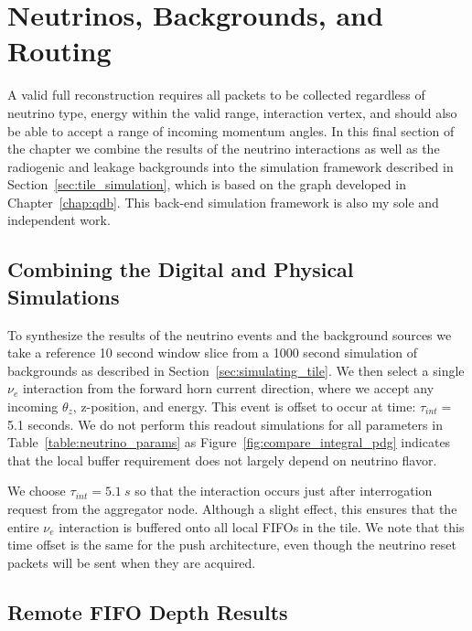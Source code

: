 \section{Neutrinos, Backgrounds, and Routing}

A valid full reconstruction requires all packets to be collected regardless of neutrino type, energy within the valid range, interaction vertex, and should also be able to accept a range of incoming momentum angles.
In this final section of the chapter we combine the results of the neutrino interactions as well as the radiogenic and leakage backgrounds into the simulation framework described in Section~\ref{sec:tile_simulation}, which is based on the graph developed in Chapter~\ref{chap:qdb}.
This back-end simulation framework is also my sole and independent work.

\subsection{Combining the Digital and Physical Simulations}

To synthesize the results of the neutrino events and the background sources we take a reference 10 second window slice from a 1000 second simulation of backgrounds as described in Section~\ref{sec:simulating_tile}.
We then select a single $\nu_{e}$ interaction from the forward horn current direction, where we accept any incoming $\theta_{z}$, z-position, and energy.
This event is offset to occur at time: $\tau_{int} = $5.1 seconds.
We do not perform this readout simulations for all parameters in Table~\ref{table:neutrino_params} as Figure~\ref{fig:compare_integral_pdg} indicates that the local buffer requirement does not largely depend on neutrino flavor.

We choose $\tau_{int} = 5.1~\unit{s}$ so that the interaction occurs just after interrogation request from the aggregator node.
Although a slight effect, this ensures that the entire $\nu_{e}$ interaction is buffered onto all local FIFOs in the tile. 
We note that this time offset is the same for the push architecture, even though the neutrino reset packets will be sent when they are acquired.

\subsection{Remote FIFO Depth Results}

